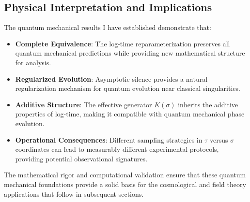 \subsection{Physical Interpretation and Implications}

The quantum mechanical results I have established demonstrate that:

\begin{itemize}
\item \textbf{Complete Equivalence}: The log-time reparameterization preserves all quantum mechanical predictions while providing new mathematical structure for analysis.

\item \textbf{Regularized Evolution}: Asymptotic silence provides a natural regularization mechanism for quantum evolution near classical singularities.

\item \textbf{Additive Structure}: The effective generator $K(\sigma)$ inherits the additive properties of log-time, making it compatible with quantum mechanical phase evolution.

\item \textbf{Operational Consequences}: Different sampling strategies in $\tau$ versus $\sigma$ coordinates can lead to measurably different experimental protocols, providing potential observational signatures.
\end{itemize}

The mathematical rigor and computational validation ensure that these quantum mechanical foundations provide a solid basis for the cosmological and field theory applications that follow in subsequent sections.